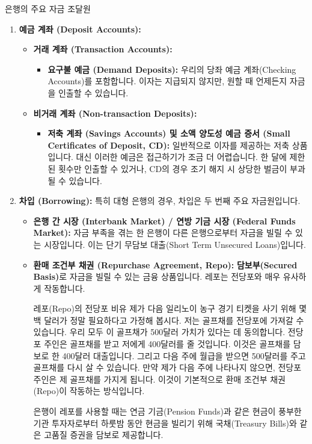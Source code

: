 \documentclass[11pt,a4paper]{article}
\begin{document}
\begin{summarybox}{은행의 주요 자금 조달원}
\begin{enumerate}
    \item \textbf{예금 계좌 (Deposit Accounts):}
    \begin{itemize}
        \item \textbf{거래 계좌 (Transaction Accounts):}
        \begin{itemize}
            \item \textbf{요구불 예금 (Demand Deposits):} 우리의 당좌 예금 계좌(Checking Accounts)를 포함합니다. 이자는 지급되지 않지만, 원할 때 언제든지 자금을 인출할 수 있습니다.
        \end{itemize}
        \item \textbf{비거래 계좌 (Non-transaction Deposits):}
        \begin{itemize}
            \item \textbf{저축 계좌 (Savings Accounts) 및 소액 양도성 예금 증서 (Small Certificates of Deposit, CD):} 일반적으로 이자를 제공하는 저축 상품입니다. 대신 이러한 예금은 접근하기가 조금 더 어렵습니다. 한 달에 제한된 횟수만 인출할 수 있거나, CD의 경우 조기 해지 시 상당한 벌금이 부과될 수 있습니다.
        \end{itemize}
    \end{itemize}

    \item \textbf{차입 (Borrowing):}
    특히 대형 은행의 경우, 차입은 두 번째 주요 자금원입니다.
    \begin{itemize}
        \item \textbf{은행 간 시장 (Interbank Market) / 연방 기금 시장 (Federal Funds Market):} 자금 부족을 겪는 한 은행이 다른 은행으로부터 자금을 빌릴 수 있는 시장입니다. 이는 단기 무담보 대출(Short Term Unsecured Loans)입니다.
        \item \textbf{환매 조건부 채권 (Repurchase Agreement, Repo):} \textbf{담보부(Secured Basis)}로 자금을 빌릴 수 있는 금융 상품입니다. 레포는 전당포와 매우 유사하게 작동합니다.
        \begin{examplebox}{레포(Repo)의 전당포 비유}
        제가 다음 일리노이 농구 경기 티켓을 사기 위해 몇백 달러가 정말 필요하다고 가정해 봅시다. 저는 골프채를 전당포에 가져갈 수 있습니다. 우리 모두 이 골프채가 500달러 가치가 있다는 데 동의합니다. 전당포 주인은 골프채를 받고 저에게 400달러를 줄 것입니다. 이것은 골프채를 담보로 한 400달러 대출입니다. 그리고 다음 주에 월급을 받으면 500달러를 주고 골프채를 다시 살 수 있습니다. 만약 제가 다음 주에 나타나지 않으면, 전당포 주인은 제 골프채를 가지게 됩니다. 이것이 기본적으로 환매 조건부 채권(Repo)이 작동하는 방식입니다.
        \end{examplebox}
        은행이 레포를 사용할 때는 연금 기금(Pension Funds)과 같은 현금이 풍부한 기관 투자자로부터 하룻밤 동안 현금을 빌리기 위해 국채(Treasury Bills)와 같은 고품질 증권을 담보로 제공합니다.


\end{itemize}
\end{enumerate}
\end{summarybox}
\end{document}
